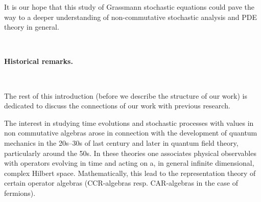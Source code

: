 \documentclass{article}
\newcommand{\tmtextbf}[1]{{\bfseries{#1}}}
\begin{document}
It is our hope that this study of Grassmann stochastic equations could pave
the way to a deeper understanding of non-commutative stochastic analysis and
PDE theory in general.

\

{\noindent}\tmtextbf{Historical remarks.}

\

The rest of this introduction (before we describe the structure of our work)
is dedicated to discuss the connections of our work with previous research.

The interest in studying time evolutions and stochastic processes with values
in non commutative algebras arose in connection with the development of
quantum mechanics in the 20s--30s of last century and later in quantum field
theory, particularly around the 50s. In these theories one associates physical
observables with operators evolving in time and acting on a, in general
infinite dimensional, complex Hilbert space. Mathematically, this lead to the
representation theory of certain operator algebras (CCR-algebras resp.
CAR-algebras in the case of fermions).
\end{document}
